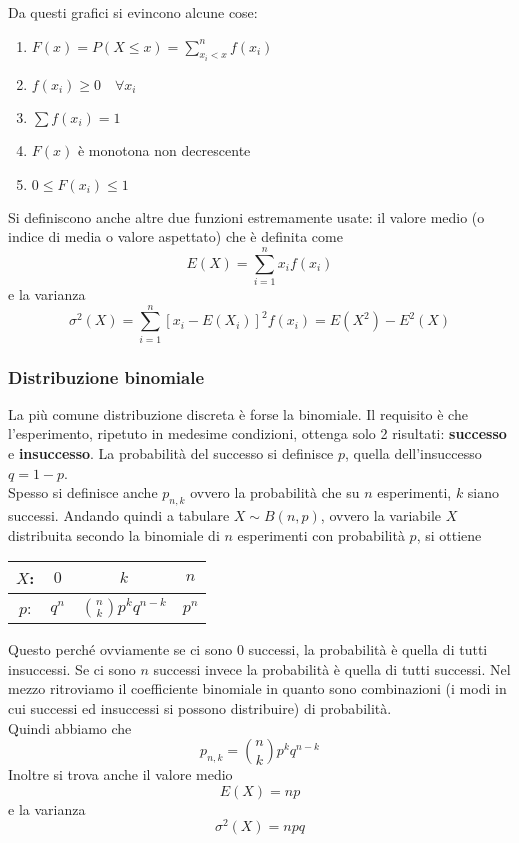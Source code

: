 Da questi grafici si evincono alcune cose:
\begin{enumerate}
  \item $F(x)=P(X\leq x)=\sum\limits^{n}_{x_i<x} f(x_i)$
  \item $f(x_i)\geq0\quad\forall x_i$
  \item $\sum f(x_i)=1$
  \item $F(x)$ è monotona non decrescente
  \item $0\leq F(x_i)\leq1$
\end{enumerate}
Si definiscono anche altre due funzioni estremamente usate: il valore medio (o indice di media o
valore aspettato) che è definita come
\begin{equation*}
  E(X) = \sum\limits^{n}_{i=1} x_if(x_i)
\end{equation*}
e la varianza
\begin{equation*}
  \sigma^2(X) = \sum\limits^{n}_{i=1} [x_i-E(X_i)]^2f(x_i) = E(X^2)-E^2(X)
\end{equation*}

\subsubsection{Distribuzione binomiale}
La più comune distribuzione discreta è forse la binomiale. Il requisito è che l'esperimento, 
ripetuto in medesime condizioni, ottenga solo 2 risultati: \textbf{successo} e \textbf{insuccesso}.
La probabilità del successo si definisce $p$, quella dell'insuccesso $q=1-p$.\\
Spesso si definisce anche $p_{n,k}$ ovvero la probabilità che su $n$ esperimenti, $k$ siano 
successi. Andando quindi a tabulare $X\sim B(n,p)$, ovvero la variabile $X$ distribuita secondo la
binomiale di $n$ esperimenti con probabilità $p$, si ottiene
\begin{center}
  \begin{tabular}{c c c c}
    $X$: & $0$ & $k$ & $n$\\\midrule
    $p$: & $q^n$ & $\binom{n}{k}p^kq^{n-k}$ & $p^n$
  \end{tabular}
\end{center}
Questo perché ovviamente se ci sono $0$ successi, la probabilità è quella di tutti insuccessi. Se 
ci sono $n$ successi invece la probabilità è quella di tutti successi. Nel mezzo ritroviamo il
coefficiente binomiale in quanto sono combinazioni (i modi in cui successi ed insuccessi si possono
distribuire) di probabilità.\\ [\baselineskip]
Quindi abbiamo che
\begin{equation*}
  p_{n,k} = \binom{n}{k} p^kq^{n-k}
\end{equation*}
Inoltre si trova anche il valore medio
\begin{equation*}
  E(X) = np
\end{equation*}
e la varianza
\begin{equation*}
  \sigma^2(X) = npq
\end{equation*}

